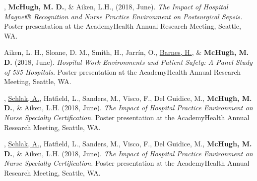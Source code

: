 \documentclass[10pt,]{article}
\begin{document}
{{{{{{{{{{{{{{\begin{hangparas}{.25in}{1}
\end{hangparas}

\vspace{4mm}

\begin{hangparas}{.25in}{1}

, {\textbf {McHugh, M. D.}}, \& Aiken, L.H., (2018, June). {\textit {The Impact of Hospital Magnet® Recognition and Nurse Practice Environment on Postsurgical Sepsis.}} Poster presentation at the AcademyHealth Annual Research Meeting, Seattle, WA.

\end{hangparas}

\vspace{4mm}

\begin{hangparas}{.25in}{1}

\*Aiken, L. H., Sloane, D. M., Smith, H., Jarrín, O., {\underline {Barnes, H.}}, \& {\textbf {McHugh, M. D.}} (2018, June). {\textit {Hospital Work Environments and Patient Safety: A Panel Study of 535 Hospitals.}} Poster presentation at the AcademyHealth Annual Research Meeting, Seattle, WA.

\end{hangparas}

\vspace{4mm}

\begin{hangparas}{.25in}{1}

, {\underline {Schlak, A.}}, Hatfield, L., Sanders, M., Visco, F., Del Guidice, M., {\textbf {McHugh, M. D.}}, \& Aiken, L.H. (2018, June). {\textit {The Impact of Hospital Practice Environment on Nurse Specialty Certification.}} Poster presentation at the AcademyHealth Annual Research Meeting, Seattle, WA.

\end{hangparas}

\vspace{4mm}

\begin{hangparas}{.25in}{1}

, {\underline {Schlak, A.}}, Hatfield, L., Sanders, M., Visco, F., Del Guidice, M., {\textbf {McHugh, M. D.}}, \& Aiken, L.H. (2018, June). {\textit {The Impact of Hospital Practice Environment on Nurse Specialty Certification.}} Poster presentation at the AcademyHealth Annual Research Meeting, Seattle, WA.


\end{hangparas}}}}}}}}}}}}}}}
\end{document}
